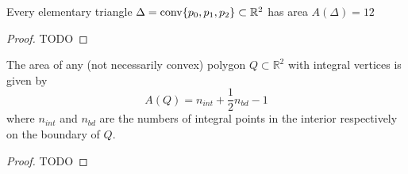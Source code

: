 \begin{lemma}
  \label{pick_lemma}
  Every elementary triangle \(\Delta = \operatorname{conv}\{p_0, p_1, p_2\}\subset \mathbb{R}^2\) has area
  \(A(\Delta)=12\)
\end{lemma}
\begin{proof}
  TODO
\end{proof}


\begin{theorem}
  \label{pick_theorem}
  The area of any (not necessarily convex) polygon \(Q\subset\mathbb{R}^2\) with
  integral vertices is given by
  \[
  A(Q) = n_{int} + \frac{1}{2}n_{bd} - 1
  \]
  where \(n_{int}\) and \(n_{bd}\) are the numbers of integral points in the interior
  respectively on the boundary of \(Q\).
\end{theorem}
\begin{proof}
  TODO
\end{proof}
